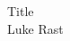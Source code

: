 \documentclass{article}[10pt]      %
\begin{document}
\begingroup  
  \centering
  \LARGE Title \\[1.5em]
  \large Luke Rast\par
\endgroup


\section*{}



\end{document}
